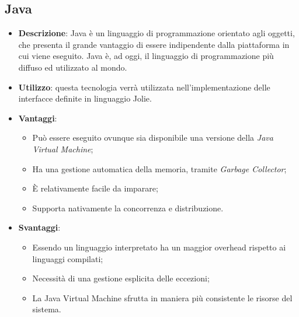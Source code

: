 \subsection{Java}
\begin{itemize}
	\item \textbf{Descrizione}: Java è un linguaggio di programmazione orientato agli oggetti, che presenta il grande vantaggio di essere indipendente dalla piattaforma in cui viene eseguito. Java è, ad oggi, il linguaggio di programmazione più diffuso ed utilizzato al mondo.
	\item \textbf{Utilizzo}: questa tecnologia verrà utilizzata nell'implementazione delle interfacce definite in linguaggio Jolie.
	\item \textbf{Vantaggi}:
	\begin{itemize}
		\item Può essere eseguito ovunque sia disponibile una versione della \textit{Java Virtual Machine};
		\item Ha una gestione automatica della memoria, tramite \textit{Garbage Collector};
		\item \MakeUppercase{è} relativamente facile da imparare;
		\item Supporta nativamente la concorrenza e distribuzione.
	\end{itemize}
	\item \textbf{Svantaggi}:
	\begin{itemize}
		\item Essendo un linguaggio interpretato ha un maggior overhead rispetto ai linguaggi compilati;
		\item Necessità di una gestione esplicita delle eccezioni;
		\item La Java Virtual Machine sfrutta in maniera più consistente le risorse del sistema.
	\end{itemize}
\end{itemize}

